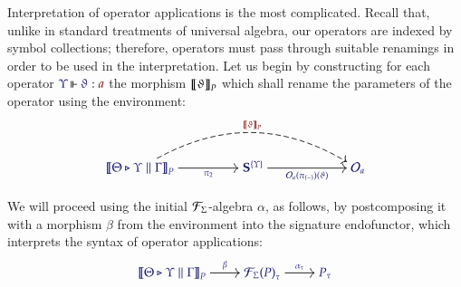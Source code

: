\documentclass[11pt]{article}
\theoremstyle{definition}
\theoremstyle{remark}
\numberwithin{equation}{section}
\begin{document}
Interpretation of operator applications is the most complicated. Recall that,
unlike in standard treatments of universal algebra, our operators are indexed by
symbol collections; therefore, operators must pass through suitable renamings in
order to be used in the interpretation. Let us begin by constructing for each
operator $\IsOperator{\Upsilon}{\vartheta}{a}$ the morphism
$\left\llbracket\vartheta\right\rrbracket_P$ which shall rename the parameters of the operator
using the environment:
\[
  \begin{tikzcd}[cramped, ampersand replacement = \&, sep = huge]
    |[alias = Src]|
    {\IMode{
      {\SemBrackets{
        \Theta\triangleright\Upsilon\parallel\Gamma
      }}_{P}
    }}
      \arrow[
        , r
        , swap
        , "\IMode{\pi_2}"
      ]
\&
    {\IMode{\SymPsh^{\{\Upsilon\}}}}
      \arrow[
        , r
        , swap
        , "\IMode{\Operators_a(\pi_{(-)})(\vartheta)}"
      ]
\&[1.5em]
    |[alias = Tgt]|
    {\IMode{\Operators_a}}
      \arrow[
        , from = Src
        , to = Tgt
        , bend left
        , dashed
        , "\OMode{\SemBrackets{\vartheta}_{P}}"
      ]
  \end{tikzcd}
\]

We will proceed using the initial $\mathcal{F}_{\Sigma}$-algebra $\alpha$, as
follows, by postcomposing it with a morphism $\beta$ from the environment into
the signature endofunctor, which interprets the syntax of operator applications:
\[
  \begin{tikzcd}[cramped, ampersand replacement = \&]
    {\IMode{
      {\SemBrackets{\Theta\triangleright\Upsilon\parallel\Gamma}}_{P}
    }}
      \arrow[r, "\IMode{\beta}"]
\&
    {\IMode{
      {\SigFun{\Sigma}(P)}_{\tau}
    }}
      \arrow[r, "\IMode{\alpha_\tau}"]
\&
    {\IMode{P_\tau}}
  \end{tikzcd}
\]
\end{document}
